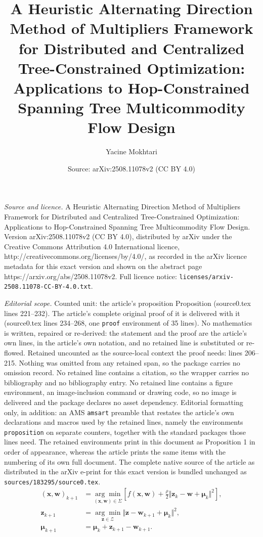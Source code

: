 \documentclass[10pt,a4paper]{amsart}
\title{A Heuristic Alternating Direction Method of Multipliers Framework for Distributed and Centralized Tree-Constrained Optimization:\\ Applications to Hop-Constrained Spanning Tree Multicommodity Flow Design}
\author{Yacine Mokhtari}
\date{Source: arXiv:2508.11078v2 (CC BY 4.0)}
\begin{document}
\maketitle

\noindent\emph{Source and licence.} A Heuristic Alternating Direction Method of Multipliers Framework for Distributed and Centralized Tree-Constrained Optimization:\\ Applications to Hop-Constrained Spanning Tree Multicommodity Flow Design. Version arXiv:2508.11078v2 (CC BY 4.0), distributed by arXiv under the Creative Commons Attribution 4.0 International licence, http://creativecommons.org/licenses/by/4.0/, as recorded in the arXiv licence metadata for this exact version and shown on the abstract page https://arxiv.org/abs/2508.11078v2. Full licence notice: \texttt{licenses/arxiv-2508.11078-CC-BY-4.0.txt}.\par\smallskip

\noindent\textit{Editorial scope.} Counted unit: the article's proposition Proposition (source0.tex lines 221--232). The article's complete original proof of it is delivered with it (source0.tex lines 234--268, one \texttt{proof} environment of 35 lines). No mathematics is written, repaired or re-derived: the statement and the proof are the article's own lines, in the article's own notation, and no retained line is substituted or re-flowed.  Retained uncounted as the source-local context the proof needs: lines 206--215.  Nothing was omitted from any retained span, so the package carries no omission record.  No retained line contains a citation, so the wrapper carries no bibliography and no bibliography entry.  No retained line contains a figure environment, an image-inclusion command or drawing code, so no image is delivered and the package declares no asset dependency.  Editorial formatting only, in addition: an AMS \texttt{amsart} preamble that restates the article's own declarations and macros used by the retained lines, namely the environments \texttt{proposition} on separate counters, together with the standard packages those lines need.  The retained environments print in this document as Proposition 1 in order of appearance, whereas the article prints the same items with the numbering of its own full document.  The complete native source of the article as distributed in the arXiv e-print for this exact version is bundled unchanged as \texttt{sources/183295/source0.tex}.
		\begin{align}
			(\boldsymbol{x},\boldsymbol{w})_{k+1}& =\underset{(\boldsymbol{x},%
				\boldsymbol{w})\in \Sigma }{\arg \min }\left[ f(\boldsymbol{x},\boldsymbol{w}%
			)+\frac{\rho }{2}\Vert \boldsymbol{z}_{k}-\boldsymbol{w}+\boldsymbol{\mu }%
			_{k}\Vert^{2}\right] ,  \label{AA1} \\[1ex]
			\boldsymbol{z}_{k+1}& =\underset{\boldsymbol{z}\in \mathcal{Z}}{\arg \min }%
			\Vert \boldsymbol{z}-\boldsymbol{w}_{k+1}+\boldsymbol{\mu }_{k}\Vert^{2},  \label{AA2} \\[1ex]
			\boldsymbol{\mu }_{k+1}& =\boldsymbol{\mu }_{k}+\boldsymbol{z}_{k+1}-%
			\boldsymbol{w}_{k+1}.  \label{AA3}
		\end{align}
\end{document}
